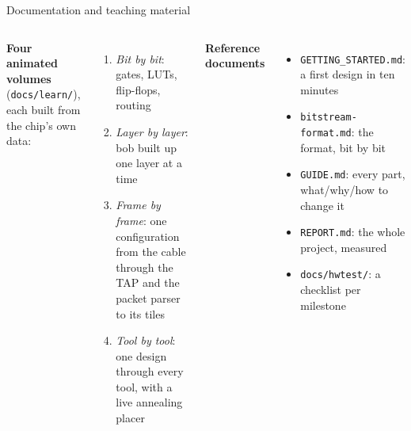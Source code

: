 \documentclass[aspectratio=169,11pt]{beamer}
\begin{document}
\begin{frame}{Documentation and teaching material}
  \begin{columns}[T]
    \small
    \textbf{Four animated volumes} (\texttt{docs/learn/}), each built from the chip's own data:
    \begin{enumerate}
      \item \emph{Bit by bit}: gates, LUTs, flip-flops, routing
      \item \emph{Layer by layer}: bob built up one layer at a time
      \item \emph{Frame by frame}: one configuration from the cable through the TAP and the packet parser to its tiles
      \item \emph{Tool by tool}: one design through every tool, with a live annealing placer
    \end{enumerate}
    \small
    \textbf{Reference documents}
    \begin{itemize}
      \item \texttt{GETTING\_STARTED.md}: a first design in ten minutes
      \item \texttt{bitstream-format.md}: the format, bit by bit
      \item \texttt{GUIDE.md}: every part, what/why/how to change it
      \item \texttt{REPORT.md}: the whole project, measured
      \item \texttt{docs/hwtest/}: a checklist per milestone
    \end{itemize}
  \end{columns}
\end{frame}

\end{document}
